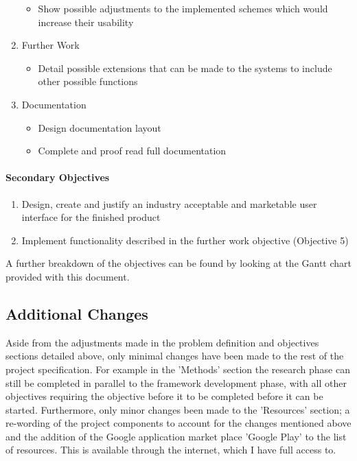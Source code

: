 \documentclass[a4paper,11pt]{article}
\begin{document}
\begin{enumerate}
\begin{itemize}
    \item Show possible adjustments to the implemented schemes which would increase their usability
  \end{itemize}
  \item Further Work
  \begin{itemize}
    \item Detail possible extensions that can be made to the systems to include other possible functions
  \end{itemize}
  \item Documentation
  \begin{itemize}
    \item Design documentation layout
    \item Complete and proof read full documentation
  \end{itemize}
\end{enumerate}

\paragraph{Secondary Objectives}
\begin{enumerate}
  \item Design, create and justify an industry acceptable and marketable user interface for the finished product
  \item Implement functionality described in the further work objective (Objective 5)
\end{enumerate}

\vspace{3pt}
A further breakdown of the objectives can be found by looking at the Gantt chart provided with this document.

\subsection{Additional Changes}

Aside from the adjustments made in the problem definition and objectives sections detailed above, only minimal changes have been made to the rest of the project specification. For example in the 'Methods' section the research phase can still be completed in parallel to the framework development phase, with all other objectives requiring the objective before it to be completed before it can be started. Furthermore, only minor changes been made to the 'Resources' section; a re-wording of the project components to account for the changes mentioned above and the addition of the Google application market place 'Google Play'\cite{googleplay} to the list of resources. This is available through the internet, which I have full access to.
\end{document}

